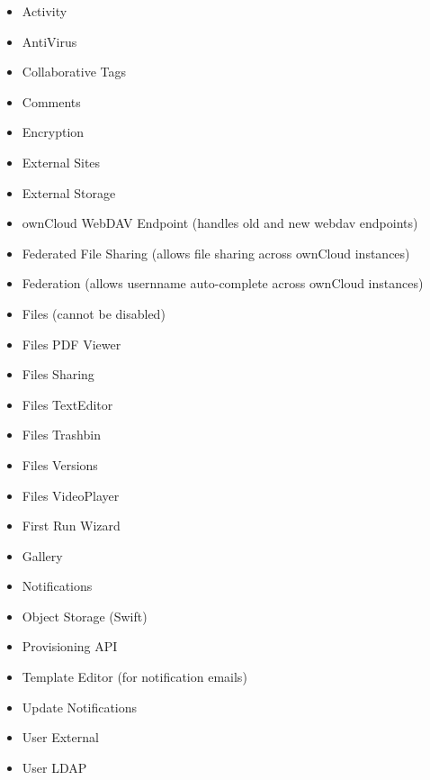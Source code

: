 \documentclass[letterpaper,10pt,english]{sphinxmanual}
\begin{document}
\label{installation/apps_supported:agpl-apps}\begin{itemize}
\item {} 
Activity

\item {} 
AntiVirus

\item {} 
Collaborative Tags

\item {} 
Comments

\item {} 
Encryption

\item {} 
External Sites

\item {} 
External Storage

\item {} 
ownCloud WebDAV Endpoint (handles old and new webdav endpoints)

\item {} 
Federated File Sharing (allows file sharing across ownCloud instances)

\item {} 
Federation (allows usernname auto-complete across ownCloud instances)

\item {} 
Files (cannot be disabled)

\item {} 
Files PDF Viewer

\item {} 
Files Sharing

\item {} 
Files TextEditor

\item {} 
Files Trashbin

\item {} 
Files Versions

\item {} 
Files VideoPlayer

\item {} 
First Run Wizard

\item {} 
Gallery

\item {} 
Notifications

\item {} 
Object Storage (Swift)

\item {} 
Provisioning API

\item {} 
Template Editor (for notification emails)

\item {} 
Update Notifications

\item {} 
User External

\item {} 
User LDAP

\end{itemize}
\end{document}

